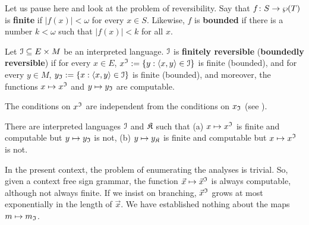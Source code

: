 Let us pause here and look at the problem of reversibility. Say 
that $f \colon S \rightarrow \wp(T)$ is \textbf{finite} 
if $|f(x)| < \omega$ for every $x \in S$. Likewise, $f$ is 
\textbf{bounded} if there is a number $k < \omega$ such that 
$|f(x)| < k$ for all $x$.
\begin{defn}
\label{defn:reverse}
Let $\mathcal{I} \subseteq E \times M$ be an interpreted language. 
$\mathcal{I}$ is \textbf{finitely reversible} (\textbf{boundedly 
reversible}) if for every $x \in E$, $x^{\mathfrak{I}} := \{y : 
\langle x,y\rangle \in \mathcal{I}\}$ is finite (bounded), and for every 
$y \in M$, $y_{\mathfrak{I}} := \{x : \langle x,y\rangle \in \mathcal{I}\}$ is finite 
(bounded), and moreover, the functions $x \mapsto x^{\mathfrak{I}}$ and 
$y \mapsto y_{\mathfrak{I}}$ are computable.
\end{defn}
The conditions on $x^{\mathfrak{I}}$ are independent 
from the conditions on $x_{\mathfrak{I}}$ 
(see \cite{dymetman:reversible,dymetman:thesis}).
\begin{thm}[Dymetman]
There are interpreted languages $\mathcal{I}$ and $\mathfrak{K}$ such that 
(a) $x \mapsto x^{\mathfrak{I}}$ is finite and computable but 
$y \mapsto y_{\mathfrak{I}}$ is not, 
(b) $y \mapsto y_{\mathfrak{K}}$ is finite and computable but 
$x \mapsto x^{\mathfrak{I}}$ is not.
\end{thm}
In the present context, the problem of enumerating the analyses 
is trivial. So, given a context free sign grammar, the function 
$\vec{x} \mapsto \vec{x}^{\mathfrak{I}}$ is always computable, although 
not always finite. If we insist on branching, $\vec{x}^{\mathfrak{I}}$ 
grows at most exponentially in the length of $\vec{x}$. We have 
established nothing about the maps $m \mapsto m_{\mathfrak{I}}$.


